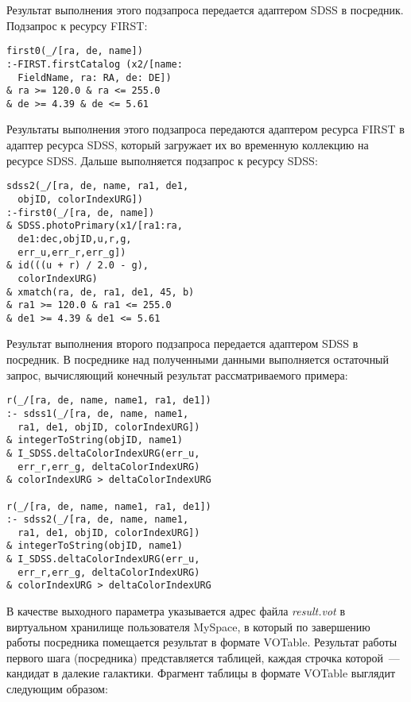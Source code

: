 \begin{multicols}{2}
     Результат выполнения этого подзапроса передается адаптером SDSS в посредник.
Подзапрос к ресурсу FIRST:
     \begin{verbatim}
first0(_/[ra, de, name])
:-FIRST.firstCatalog (x2/[name:
  FieldName, ra: RA, de: DE])
& ra >= 120.0 & ra <= 255.0
& de >= 4.39 & de <= 5.61
\end{verbatim}

Результаты выполнения этого подзапроса передаются адаптером ресурса FIRST в
адаптер ресурса SDSS, который загружает их во временную коллекцию на ресурсе SDSS.
Дальше выполняется подзапрос к ресурсу SDSS:
     \begin{verbatim}
sdss2(_/[ra, de, name, ra1, de1,
  objID, colorIndexURG])
:-first0(_/[ra, de, name])
& SDSS.photoPrimary(x1/[ra1:ra,
  de1:dec,objID,u,r,g,
  err_u,err_r,err_g])
& id(((u + r) / 2.0 - g),
  colorIndexURG)
& xmatch(ra, de, ra1, de1, 45, b)
& ra1 >= 120.0 & ra1 <= 255.0
& de1 >= 4.39 & de1 <= 5.61
       \end{verbatim}
\vspace*{-12pt}


     Результат выполнения второго подзапроса передается адаптером SDSS в посредник.
В посреднике над полученными данными выполняется остаточный запрос, вычисляющий
конечный результат рассматриваемого примера:
     \begin{verbatim}
r(_/[ra, de, name, name1, ra1, de1])
:- sdss1(_/[ra, de, name, name1,
  ra1, de1, objID, colorIndexURG])
& integerToString(objID, name1)
& I_SDSS.deltaColorIndexURG(err_u,
  err_r,err_g, deltaColorIndexURG)
& colorIndexURG > deltaColorIndexURG

r(_/[ra, de, name, name1, ra1, de1])
:- sdss2(_/[ra, de, name, name1,
  ra1, de1, objID, colorIndexURG])
& integerToString(objID, name1)
& I_SDSS.deltaColorIndexURG(err_u,
  err_r,err_g, deltaColorIndexURG)
& colorIndexURG > deltaColorIndexURG
     \end{verbatim}
\vspace*{-12pt}

     В качестве выходного параметра указывается адрес файла \textit{result.vot} в
виртуальном хранилище пользователя MySpace, в который по завершению работы
посредника помещается результат в формате VOTable.
     Результат работы первого шага (посредника) представляется таблицей, каждая
строчка которой~--- кандидат в далекие галактики. 
Фрагмент таблицы в формате VOTable выглядит
следующим образом:


\end{multicols}
